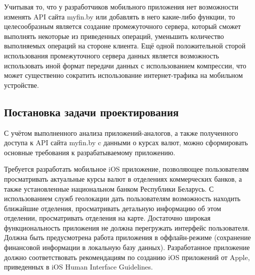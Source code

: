 Учитывая то, что у разработчиков мобильного приложения нет возможности изменять
API сайта myfin.by или добавлять в него какие-либо функции, то целесообразным
является создание промежуточного сервера, который сможет выполнять некоторые
из приведенных операций, уменьшить количество выполняемых операций на стороне
клиента. Ещё одной положительной сторой использования промежуточного сервера
данных является возможность использовать иной формат передачи данных с
использованием компрессии, что может существенно сократить использование
интернет-трафика на мобильном устройстве.


\subsection{Постановка задачи проектирования}

С учётом выполненного анализа приложений-аналогов, а также полученного доступа к
API сайта myfin.by c данными о курсах валют, можно сформировать основные
требования к разрабатываемому приложению.

Требуется разработать мобильное iOS приложение, позволяющее пользователям
просматривать актуальные курсы валют в отделениях коммерческих банков, а также
установленные национальном банком Республики Беларусь. С использованием
служб геолокации дать пользователям возможность находить ближайшие отделения,
просматривать детальную информацию об этом отделении, просматривать отделения
на карте. Достаточно широкая функциональность приложения не должна перегружать
интерфейс пользователя. Должна быть предусмотрена работа приложения в
оффлайн-режиме (сохранение финансовой информации в локальную базу данных).
Разработанное приложение должно соответствовать рекомендациям по созданию
iOS приложений от Apple, приведенных в iOS Human Interface Guidelines.

\pagebreak
